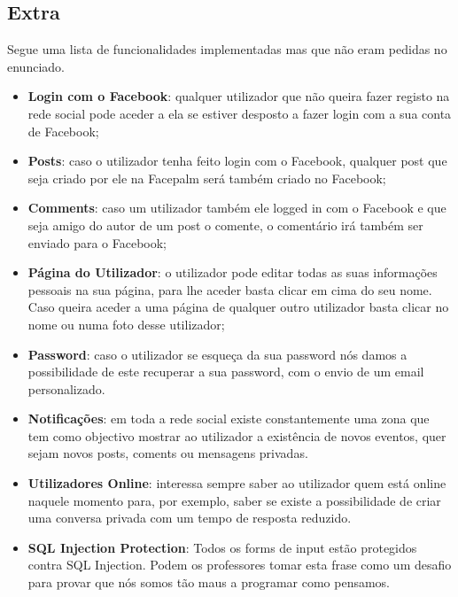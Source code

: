 \documentclass[a4paper, 12pt]{article}
\begin{document}
\subsection{Extra}
\indent \indent Segue uma lista de funcionalidades implementadas mas que não eram pedidas no enunciado.
\begin{itemize}
	\item \textbf{Login com o Facebook}: qualquer utilizador que não queira fazer registo na rede social pode aceder a ela se estiver desposto a fazer login com a sua conta de Facebook;
	\item \textbf{Posts}: caso o utilizador tenha feito login com o Facebook, qualquer post que seja criado por ele na Facepalm será também criado no Facebook;
	\item \textbf{Comments}: caso um utilizador também ele logged in com o Facebook e que seja amigo do autor de um post o comente, o comentário irá também ser enviado para o Facebook;
	\item \textbf{Página do Utilizador}: o utilizador pode editar todas as suas informações pessoais na sua página, para lhe aceder basta clicar em cima do seu nome. Caso queira aceder a uma página de qualquer outro utilizador basta clicar no nome ou numa foto desse utilizador;
	\item \textbf{Password}: caso o utilizador se esqueça da sua password nós damos a possibilidade de este recuperar a sua password, com o envio de um email personalizado.
	\item \textbf{Notificações}: em toda a rede social existe constantemente uma zona que tem como objectivo mostrar ao utilizador a existência de novos eventos, quer sejam novos posts, coments ou mensagens privadas.
	\item \textbf{Utilizadores Online}: interessa sempre saber ao utilizador quem está online naquele momento para, por exemplo, saber se existe a possibilidade de criar uma conversa privada com um tempo de resposta reduzido.
	\item \textbf{SQL Injection Protection}: Todos os forms de input estão protegidos contra SQL Injection. Podem os professores tomar esta frase como um desafio para provar que nós somos tão maus a programar como pensamos.
\end{itemize}
\cleardoublepage
\end{document}
